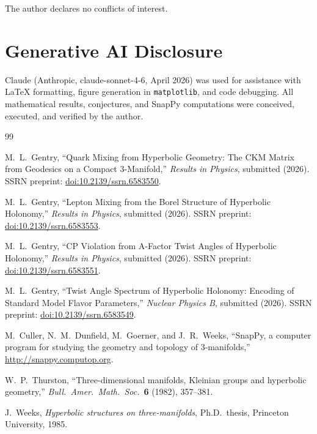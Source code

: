 \documentclass[12pt]{article}
\theoremstyle{definition}
\begin{document}
The author declares no conflicts of interest.

\section*{Generative AI Disclosure}
Claude (Anthropic, claude-sonnet-4-6, April 2026) was used for 
assistance with \LaTeX{} formatting, figure generation in 
\texttt{matplotlib}, and code debugging. All mathematical results, 
conjectures, and SnapPy computations were conceived, executed, and 
verified by the author.

\begin{thebibliography}{99}

  M.~L.~Gentry,
  ``Quark Mixing from Hyperbolic Geometry: The CKM Matrix from Geodesics
  on a Compact 3-Manifold,''
  \textit{Results in Physics}, submitted (2026).
  SSRN preprint: \href{https://doi.org/10.2139/ssrn.6583550}
  {doi:10.2139/ssrn.6583550}.

  M.~L.~Gentry,
  ``Lepton Mixing from the Borel Structure of Hyperbolic Holonomy,''
  \textit{Results in Physics}, submitted (2026).
  SSRN preprint: \href{https://doi.org/10.2139/ssrn.6583553}
  {doi:10.2139/ssrn.6583553}.

  M.~L.~Gentry,
  ``CP Violation from A-Factor Twist Angles of Hyperbolic Holonomy,''
  \textit{Results in Physics}, submitted (2026).
  SSRN preprint: \href{https://doi.org/10.2139/ssrn.6583551}
  {doi:10.2139/ssrn.6583551}.

  M.~L.~Gentry,
  ``Twist Angle Spectrum of Hyperbolic Holonomy: Encoding of Standard
  Model Flavor Parameters,''
  \textit{Nuclear Physics B}, submitted (2026).
  SSRN preprint: \href{https://doi.org/10.2139/ssrn.6583549}
  {doi:10.2139/ssrn.6583549}.

  M.~Culler, N.~M.~Dunfield, M.~Goerner, and J.~R.~Weeks,
  ``SnapPy, a computer program for studying the geometry and topology
  of 3-manifolds,''
  \url{http://snappy.computop.org}.

  W.~P.~Thurston,
  ``Three-dimensional manifolds, Kleinian groups and hyperbolic
  geometry,''
  \textit{Bull.\ Amer.\ Math.\ Soc.}\ \textbf{6} (1982), 357--381.

  J.~Weeks,
  \textit{Hyperbolic structures on three-manifolds},
  Ph.D.\ thesis, Princeton University, 1985.

\end{thebibliography}
\end{document}
